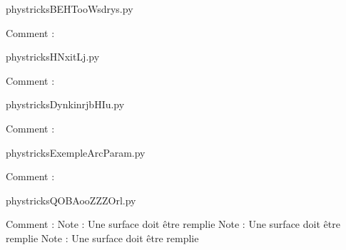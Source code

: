 
    \newcommand{\CaptionFigBEHTooWsdrys}{<+Type your caption here+>}
    \begin{center}
        
    \end{center}
    phystricksBEHTooWsdrys.py

    Comment : 

    \clearpage
    


    \newcommand{\CaptionFigHNxitLj}{<+Type your caption here+>}
    \begin{center}
        
    \end{center}
    phystricksHNxitLj.py

    Comment : 

    \clearpage
    


    \newcommand{\CaptionFigDynkinrjbHIu}{<+Type your caption here+>}
    \begin{center}
        
    \end{center}
    phystricksDynkinrjbHIu.py

    Comment : 

    \clearpage
    


    \newcommand{\CaptionFigExempleArcParam}{<+Type your caption here+>}
    \begin{center}
        
    \end{center}
    phystricksExempleArcParam.py

    Comment : 

    \clearpage
    


    \newcommand{\CaptionFigQOBAooZZZOrl}{<+Type your caption here+>}
    \begin{center}
        
    \end{center}
    phystricksQOBAooZZZOrl.py

    Comment : Note : Une surface doit être remplie
Note : Une surface doit être remplie
Note : Une surface doit être remplie

    \clearpage
    

